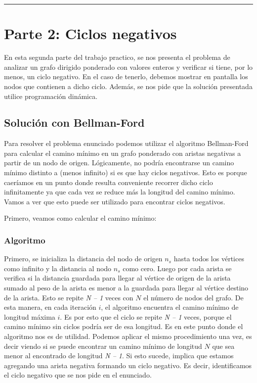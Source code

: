 \documentclass[titlepage,a4paper]{article}
\begin{document}
\noindent\rule{\textwidth}{0.5pt}

\newpage

\section{Parte 2: Ciclos negativos}
\label{sec:org662efdc}

En esta segunda parte del trabajo practico, se nos presenta el problema de
analizar un grafo dirigido ponderado con valores enteros y verificar si tiene,
por lo menos, un ciclo negativo. En el caso de tenerlo, debemos mostrar en
pantalla los nodos que contienen a dicho ciclo. Además, se nos pide que la
solución presentada utilice programación dinámica.

\subsection{Solución con Bellman-Ford}
\label{sec:org78048b8}
Para resolver el problema enunciado podemos utilizar el algoritmo Bellman-Ford
para calcular el camino mínimo en un grafo ponderado con aristas negativas a
partir de un nodo de origen. Lógicamente, no podría encontrarse un camino mínimo
distinto a (menos infinito) si es que hay ciclos negativos. Esto es porque
caeríamos en un punto donde resulta conveniente recorrer dicho ciclo
infinitamente ya que cada vez se reduce más la longitud del camino mínimo. Vamos
a ver que esto puede ser utilizado para encontrar ciclos negativos.


\hfill

Primero, veamos como calcular el camino mínimo:

\subsubsection{Algoritmo}
\label{sec:org2a5c3a3}

Primero, se inicializa la distancia del nodo de origen \(n_s\) hasta todos los
vértices como infinito y la distancia al nodo \(n_s\) como cero. Luego por cada
arista se verifica si la distancia guardada para llegar al vértice de origen de
la arista sumado al peso de la arista es menor a la guardada para llegar al
vértice destino de la arista. Esto se repite \emph{N – 1} veces con \(N\) el número de
nodos del grafo. De esta manera, en cada iteración \(i\), el algoritmo encuentra el
camino mínimo de longitud máxima \(i\). Es por esto que el ciclo se repite \emph{N – 1}
veces, porque el camino mínimo sin ciclos podría ser de esa longitud. Es en este
punto donde el algoritmo nos es de utilidad. Podemos aplicar el mismo
procedimiento una vez, es decir viendo si se puede encontrar un camino mínimo de
longitud \(N\) que sea menor al encontrado de longitud \emph{N – 1}. Si esto sucede,
implica que estamos agregando una arista negativa formando un ciclo negativo. Es
decir, identificamos el ciclo negativo que se nos pide en el enunciado.
\end{document}

